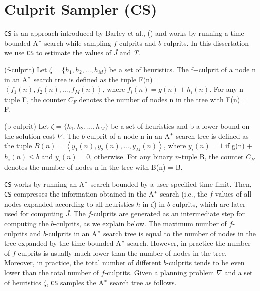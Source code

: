 \section{Culprit Sampler (CS)}
\noindent
\texttt{CS} is an approach introduced by Barley et al., (\citeyear{BarleySantiagoOver}) and works by running a time-bounded A$\sp{*}$ search while sampling $f$-culprits and $b$-culprits. In this dissertation we use \texttt{CS} to estimate the values of \textit{\^{J}} and \textit{\^{T}}.

\begin{definition}(f-culprit)
Let $\zeta = \{h_{1}, h_{2},...,h_{M}\}$ be a set of heuristics. The f$-$culprit of a node n in an A$\sp{*}$ search tree is defined as the tuple F(n) = $\left\langle f_{1}(n), f_{2}(n),...,f_{M}(n)  \right\rangle$, where $f_{i}(n) = g(n)+h_{i}(n)$. For any n$-$tuple F, the counter $C_{F}$ denotes the number of nodes n in the tree with F(n) = F.
\label{def:def_fculprits}
\end{definition}

\begin{definition}(b-culprit)
Let $\zeta = \{h_{1}, h_{2},...,h_{M}\}$ be a set of heuristics and b a lower bound on the solution cost $\nabla$. The $b$-culprit of a node n in an A$\sp{*}$ search tree is defined as the tuple $B(n) = \left\langle y_{1}(n), y_{2}(n),...,y_{M}(n)\right\rangle$, where $y_{i}(n) = 1$ if g(n) + $h_{i}(n) \leq b$ and $y_{i}(n) = 0$, otherwise.  For any binary $n$-tuple B, the counter $C_{B}$ denotes the number of nodes n in the tree with B(n) = B.
\label{def:def_bculprits}
\end{definition}

\texttt{CS} works by running an A$\sp{*}$ search bounded by a user-specified time limit. Then, \texttt{CS} compresses the information obtained in the A$\sp{*}$ search (i.e., the $f$-values of all nodes expanded according to all heuristics $h$ in $\zeta$) in $b$-culprits, which are later used for computing \textit{\^{J}}. The $f$-culprits are generated as an intermediate step for computing the $b$-culprits, as we explain below. The maximum number of $f$-culprits and $b$-culprits in an A$\sp{*}$ search tree is equal to the number of nodes in the tree expanded by the time-bounded A$\sp{*}$ search. However, in practice the number of $f$-culprits is usually much lower than the number of nodes in the tree. Moreover, in practice, the total number of different $b$-culprits tends to be even lower than the total number of $f$-culprits. Given a planning problem $\nabla$ and a set of heuristics $\zeta$, \texttt{CS} samples the A$\sp{*}$ search tree as follows.

